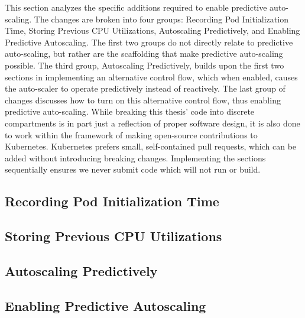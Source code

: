 This section analyzes the specific additions required to enable predictive auto-scaling.
The changes are broken into four groups: Recording Pod Initialization Time,
Storing Previous CPU Utilizations, Autoscaling Predictively, and Enabling
Predictive Autoscaling. The first two groups do not directly relate to
predictive auto-scaling, but rather are the scaffolding that make predictive
auto-scaling possible. The third group, Autoscaling Predictively, builds upon
the first two sections in implementing an alternative control flow, which when
enabled, causes the auto-scaler to operate predictively instead of reactively.
The last group of changes discusses how to turn on this alternative control
flow, thus enabling predictive auto-scaling. While breaking this thesis' code
into discrete compartments is in part just a reflection of proper software design,
it is also done to work within the framework of making open-source contributions
to Kubernetes. Kubernetes prefers small, self-contained pull requests, which can
be added without introducing breaking changes. Implementing the sections sequentially ensures
we never submit code which will not run or build.

\subsection{Recording Pod Initialization Time}



\subsection{Storing Previous CPU Utilizations}



\subsection{Autoscaling Predictively}
\label{autoscaling-predictively}



\subsection{Enabling Predictive Autoscaling}


